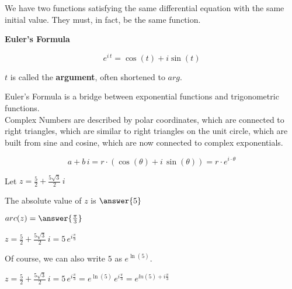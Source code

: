 \documentclass{ximera}
\begin{document}
We have two functions satisfying the same differential equation with the same initial value.  They must, in fact, be the same function. \\




\begin{theorem} \textbf{\textcolor{green!50!black}{Euler's Formula}}   


\[   e^{i \, t} = \cos(t) + i \sin(t)         \]



$t$ is called the \textbf{argument}, often shortened to $arg$.  

\end{theorem}




Euler's Formula is a bridge between exponential functions and trigonometric functions. \\




Complex Numbers are described by polar coordinates, which are connected to right triangles, which are similar to right triangles on the unit circle, which are built from sine and cosine, which are now connected to complex exponentials.




\begin{center}


\[
a + b \, i =  r \cdot (\cos(\theta) + i \, \sin(\theta)) = r \cdot e^{i \cdot \theta}
\]

\end{center}






\begin{example}


Let $z = \frac{5}{2} + \frac{5\sqrt{3}}{2} \, i$

The absolute value of $z$ is $\answer{5}$ 

$arc(z) = \answer{\frac{\pi}{3}}$


$z = \frac{5}{2} + \frac{5\sqrt{3}}{2} \, i = 5 \, e^{i \tfrac{\pi}{3}}$

\end{example}




Of course, we can also write $5$ as $e^{\ln(5)}$.


$z = \frac{5}{2} + \frac{5\sqrt{3}}{2} \, i = 5 \, e^{i \tfrac{\pi}{3}} = e^{\ln(5)} \, e^{i \tfrac{\pi}{3}} = e^{ln(5) + i \tfrac{\pi}{3}}$
\end{document}
